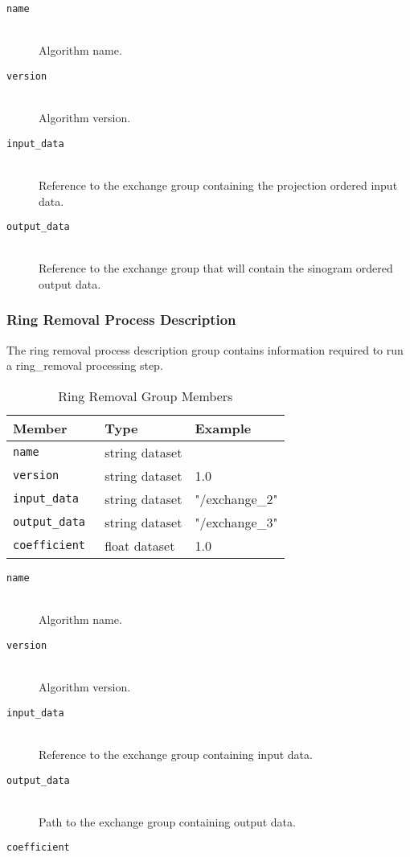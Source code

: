 \begin{description}
\item[\tt{name}] \hfill \\
{Algorithm name.}

\item[\tt{version}] \hfill \\
{Algorithm version.}

\item[\tt{input\_data}] \hfill \\
{Reference to the exchange group containing the projection ordered input data.}

\item[\tt{output\_data}] \hfill \\
{Reference to the exchange group that will contain the sinogram ordered output data.}

\end{description}

\subsubsection{Ring Removal Process Description}

The ring removal process description group contains information required to run a ring\_removal processing step.

\begin{table}[h!]\sffamily \footnotesize
\caption{Ring Removal Group Members}
\centering
{}
\begin{tabular}{l l l}
\toprule
\bfseries Member & \bfseries Type & \bfseries Example \\
\midrule
\tt{name} & string dataset &  \\  
\tt{version}  & string dataset  & 1.0 \\
\tt{input\_data} &  string dataset & "/exchange\_2" \\
\tt{output\_data} & string dataset & "/exchange\_3" \\
\tt{coefficient} & float dataset &  1.0 \\
\bottomrule
\end{tabular}
\label{table:ringremoval}
\end{table}

\begin{description}
\item[\tt{name}] \hfill \\
{Algorithm name.}

\item[\tt{version}] \hfill \\
{Algorithm version.}

\item[\tt{input\_data}] \hfill \\
{Reference to the exchange group containing input data.}

\item[\tt{output\_data}] \hfill \\
{Path to the exchange group containing output data.}

\item[\tt{coefficient}] \hfill \\
{}
\end{description}

